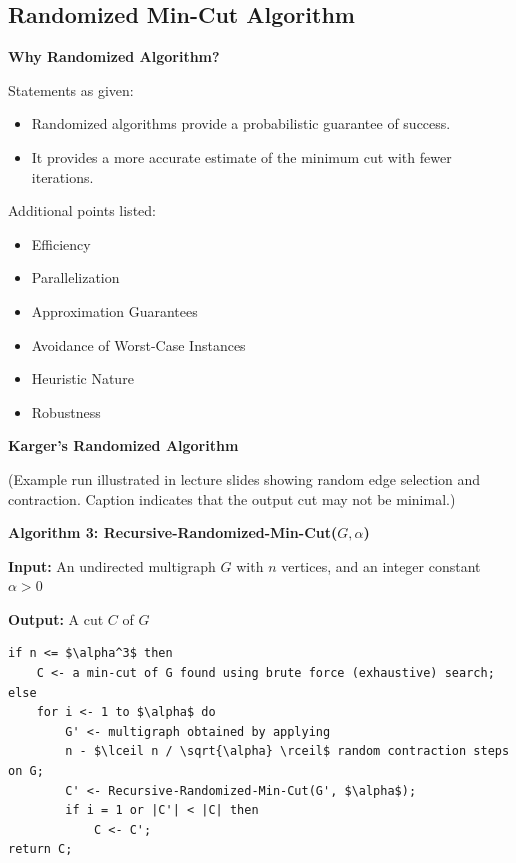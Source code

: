 \documentclass[11pt]{article}
\begin{document}
\subsection{Randomized Min-Cut Algorithm}

\textbf{Why Randomized Algorithm?}

Statements as given:

\begin{itemize}
    \item Randomized algorithms provide a probabilistic guarantee of success.
    \item It provides a more accurate estimate of the minimum cut with fewer iterations.
\end{itemize}

Additional points listed:

\begin{itemize}
    \item Efficiency
    \item Parallelization
    \item Approximation Guarantees
    \item Avoidance of Worst-Case Instances
    \item Heuristic Nature
    \item Robustness
\end{itemize}

\textbf{Karger’s Randomized Algorithm}

(Example run illustrated in lecture slides showing random edge selection and contraction. Caption indicates that the output cut may not be minimal.)

\textbf{Algorithm 3: Recursive-Randomized-Min-Cut(\( G, \alpha \))}

\textbf{Input:}  
An undirected multigraph \( G \) with \( n \) vertices, and an integer constant \( \alpha > 0 \)

\textbf{Output:}  
A cut \( C \) of \( G \)


\begin{lstlisting}
if n <= $\alpha^3$ then
    C <- a min-cut of G found using brute force (exhaustive) search;
else
    for i <- 1 to $\alpha$ do
        G' <- multigraph obtained by applying
        n - $\lceil n / \sqrt{\alpha} \rceil$ random contraction steps on G;
        C' <- Recursive-Randomized-Min-Cut(G', $\alpha$);
        if i = 1 or |C'| < |C| then
            C <- C';
return C;
\end{lstlisting}
\end{document}
